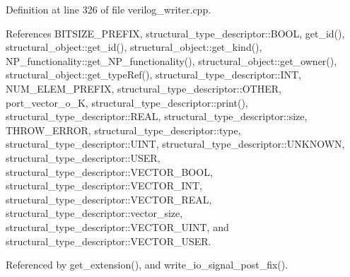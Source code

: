 Definition at line 326 of file verilog\+\_\+writer.\+cpp.



References B\+I\+T\+S\+I\+Z\+E\+\_\+\+P\+R\+E\+F\+IX, structural\+\_\+type\+\_\+descriptor\+::\+B\+O\+OL, get\+\_\+id(), structural\+\_\+object\+::get\+\_\+id(), structural\+\_\+object\+::get\+\_\+kind(), N\+P\+\_\+functionality\+::get\+\_\+\+N\+P\+\_\+functionality(), structural\+\_\+object\+::get\+\_\+owner(), structural\+\_\+object\+::get\+\_\+type\+Ref(), structural\+\_\+type\+\_\+descriptor\+::\+I\+NT, N\+U\+M\+\_\+\+E\+L\+E\+M\+\_\+\+P\+R\+E\+F\+IX, structural\+\_\+type\+\_\+descriptor\+::\+O\+T\+H\+ER, port\+\_\+vector\+\_\+o\+\_\+K, structural\+\_\+type\+\_\+descriptor\+::print(), structural\+\_\+type\+\_\+descriptor\+::\+R\+E\+AL, structural\+\_\+type\+\_\+descriptor\+::size, T\+H\+R\+O\+W\+\_\+\+E\+R\+R\+OR, structural\+\_\+type\+\_\+descriptor\+::type, structural\+\_\+type\+\_\+descriptor\+::\+U\+I\+NT, structural\+\_\+type\+\_\+descriptor\+::\+U\+N\+K\+N\+O\+WN, structural\+\_\+type\+\_\+descriptor\+::\+U\+S\+ER, structural\+\_\+type\+\_\+descriptor\+::\+V\+E\+C\+T\+O\+R\+\_\+\+B\+O\+OL, structural\+\_\+type\+\_\+descriptor\+::\+V\+E\+C\+T\+O\+R\+\_\+\+I\+NT, structural\+\_\+type\+\_\+descriptor\+::\+V\+E\+C\+T\+O\+R\+\_\+\+R\+E\+AL, structural\+\_\+type\+\_\+descriptor\+::vector\+\_\+size, structural\+\_\+type\+\_\+descriptor\+::\+V\+E\+C\+T\+O\+R\+\_\+\+U\+I\+NT, and structural\+\_\+type\+\_\+descriptor\+::\+V\+E\+C\+T\+O\+R\+\_\+\+U\+S\+ER.



Referenced by get\+\_\+extension(), and write\+\_\+io\+\_\+signal\+\_\+post\+\_\+fix().

